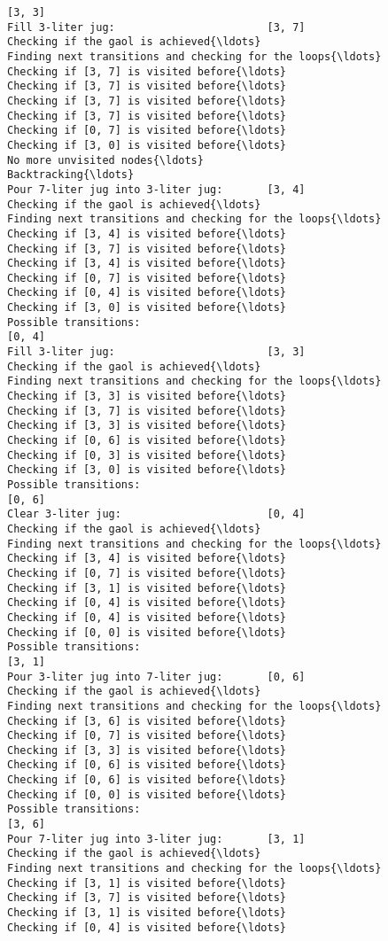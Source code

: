 \documentclass[11pt]{article}
\begin{document}
\begin{Verbatim}[commandchars=\\\{\}]
[3, 3]
Fill 3-liter jug:                        [3, 7]
Checking if the gaol is achieved{\ldots}
Finding next transitions and checking for the loops{\ldots}
Checking if [3, 7] is visited before{\ldots}
Checking if [3, 7] is visited before{\ldots}
Checking if [3, 7] is visited before{\ldots}
Checking if [3, 7] is visited before{\ldots}
Checking if [0, 7] is visited before{\ldots}
Checking if [3, 0] is visited before{\ldots}
No more unvisited nodes{\ldots}
Backtracking{\ldots}
Pour 7-liter jug into 3-liter jug:       [3, 4]
Checking if the gaol is achieved{\ldots}
Finding next transitions and checking for the loops{\ldots}
Checking if [3, 4] is visited before{\ldots}
Checking if [3, 7] is visited before{\ldots}
Checking if [3, 4] is visited before{\ldots}
Checking if [0, 7] is visited before{\ldots}
Checking if [0, 4] is visited before{\ldots}
Checking if [3, 0] is visited before{\ldots}
Possible transitions:
[0, 4]
Fill 3-liter jug:                        [3, 3]
Checking if the gaol is achieved{\ldots}
Finding next transitions and checking for the loops{\ldots}
Checking if [3, 3] is visited before{\ldots}
Checking if [3, 7] is visited before{\ldots}
Checking if [3, 3] is visited before{\ldots}
Checking if [0, 6] is visited before{\ldots}
Checking if [0, 3] is visited before{\ldots}
Checking if [3, 0] is visited before{\ldots}
Possible transitions:
[0, 6]
Clear 3-liter jug:                       [0, 4]
Checking if the gaol is achieved{\ldots}
Finding next transitions and checking for the loops{\ldots}
Checking if [3, 4] is visited before{\ldots}
Checking if [0, 7] is visited before{\ldots}
Checking if [3, 1] is visited before{\ldots}
Checking if [0, 4] is visited before{\ldots}
Checking if [0, 4] is visited before{\ldots}
Checking if [0, 0] is visited before{\ldots}
Possible transitions:
[3, 1]
Pour 3-liter jug into 7-liter jug:       [0, 6]
Checking if the gaol is achieved{\ldots}
Finding next transitions and checking for the loops{\ldots}
Checking if [3, 6] is visited before{\ldots}
Checking if [0, 7] is visited before{\ldots}
Checking if [3, 3] is visited before{\ldots}
Checking if [0, 6] is visited before{\ldots}
Checking if [0, 6] is visited before{\ldots}
Checking if [0, 0] is visited before{\ldots}
Possible transitions:
[3, 6]
Pour 7-liter jug into 3-liter jug:       [3, 1]
Checking if the gaol is achieved{\ldots}
Finding next transitions and checking for the loops{\ldots}
Checking if [3, 1] is visited before{\ldots}
Checking if [3, 7] is visited before{\ldots}
Checking if [3, 1] is visited before{\ldots}
Checking if [0, 4] is visited before{\ldots}

\end{Verbatim}
\end{document}
